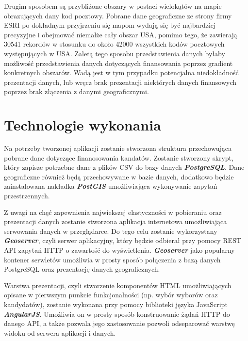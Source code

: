 \documentclass[10pt,a4paper]{article}
\begin{document}
Drugim sposobem są przybliżone obszary w postaci wielokątów na mapie obrazujących dany kod pocztowy. Pobrane dane geograficzne ze strony firmy ESRI po dokładnym przyjrzeniu się mapom wydają się być najbardziej precyzyjne i obejmować niemalże cały obszar USA, pomimo tego, że zawierają 30541 rekordów w stosunku do około 42000 wszystkich kodów pocztowych występujących w USA. Zaletą tego sposobu przedstawienia danych byłaby możliwość przedstawienia danych dotyczących finansowania poprzez gradient konkretnych obszarów. Wadą jest w tym przypadku potencjalna niedokładność prezentacji danych, lub wręcz brak prezentacji niektórych danych finansowych poprzez brak złączenia z danymi geograficznymi.
\section{Technologie wykonania}

Na potrzeby tworzonej aplikacji zostanie stworzona struktura przechowująca pobrane dane dotyczące finanosowania kandatów. Zostanie stworzony skrypt, który zapisze potrzebne dane z plików CSV do bazy danych \textit{\textbf{PostgreSQL}}. Dane geograficzne również będą przechowywane w bazie danych, dodatkowo będzie zainstalowana nakładka \textit{\textbf{PostGIS}} umożliwiająca wykonywanie zapytań przestrzennych.

Z uwagi na chęć zapewnienia najwiekszej elastyczności w pobieraniu oraz prezentacji danych zostanie stworzona aplikacja internetowa umożliwiająca serwowania danych w przeglądarce. Do tego celu zostanie wykorzystany \textit{\textbf{Geoserver}}, czyli serwer aplikacyjny, który będzie odbierał przy pomocy REST API zapytań HTTP o zawartość do wyświetlenia. \textit{\textbf{Geoserver}} jako popularny kontener serwletów umożliwia w prosty sposób połączenia z bazą danych PostgreSQL oraz prezentację danych geograficznych.

Warstwa prezentacji, czyli stworzenie komponentów HTML umożliwiających opisane w pierwszym punkcie funkcjonalności (np. wybór wyborów oraz kandydatów), zostanie wykonana przy pomocy biblioteki języka JavaScript \textit{\textbf{AngularJS}}. Umożliwia on w prosty sposób konstruowanie żądań HTTP do danego API, a także pozwala jego zastosowanie pozwoli odseparować warstwę widoku od serwera aplikacji i danych. 
\end{document}
